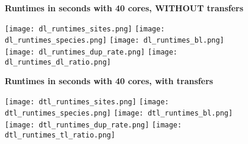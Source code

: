 \documentclass[12pt,a4paper]{article}
\begin{document}
\newcommand*{\figuretitle}[1]{%
    {\centering%
    \textbf{#1}%
    \par\medskip}%
}





\begin{figure}
\figuretitle{Runtimes in seconds with 40 cores, WITHOUT transfers}
\texttt{[image: dl\_runtimes\_sites.png]}
\texttt{[image: dl\_runtimes\_species.png]}
\texttt{[image: dl\_runtimes\_bl.png]}
\texttt{[image: dl\_runtimes\_dup\_rate.png]}
\texttt{[image: dl\_runtimes\_dl\_ratio.png]}
\end{figure}


\begin{figure}
\figuretitle{Runtimes in seconds with 40 cores, with transfers}
\texttt{[image: dtl\_runtimes\_sites.png]}
\texttt{[image: dtl\_runtimes\_species.png]}
\texttt{[image: dtl\_runtimes\_bl.png]}
\texttt{[image: dtl\_runtimes\_dup\_rate.png]}
\texttt{[image: dtl\_runtimes\_tl\_ratio.png]}
\end{figure}
\end{document}

